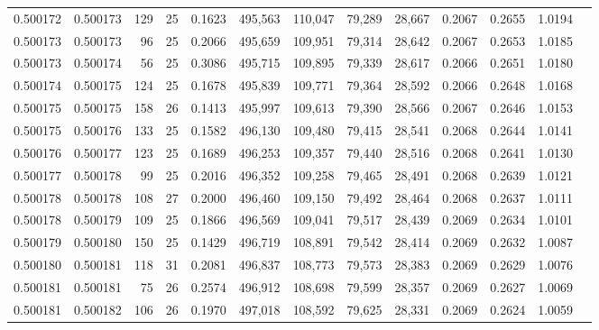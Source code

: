 \begin{tabular}{rrrrrrrrrrrrr}
0.500172 & 0.500173 & 129 &  25 &                                     0.1623 & 495,563 & 110,047 &  79,289 &  28,667 & 0.2067 & 0.2655 & 1.0194 \\
0.500173 & 0.500173 &  96 &  25 &                                     0.2066 & 495,659 & 109,951 &  79,314 &  28,642 & 0.2067 & 0.2653 & 1.0185 \\
0.500173 & 0.500174 &  56 &  25 &                                     0.3086 & 495,715 & 109,895 &  79,339 &  28,617 & 0.2066 & 0.2651 & 1.0180 \\
0.500174 & 0.500175 & 124 &  25 &                                     0.1678 & 495,839 & 109,771 &  79,364 &  28,592 & 0.2066 & 0.2648 & 1.0168 \\
0.500175 & 0.500175 & 158 &  26 &                                     0.1413 & 495,997 & 109,613 &  79,390 &  28,566 & 0.2067 & 0.2646 & 1.0153 \\
0.500175 & 0.500176 & 133 &  25 &                                     0.1582 & 496,130 & 109,480 &  79,415 &  28,541 & 0.2068 & 0.2644 & 1.0141 \\
0.500176 & 0.500177 & 123 &  25 &                                     0.1689 & 496,253 & 109,357 &  79,440 &  28,516 & 0.2068 & 0.2641 & 1.0130 \\
0.500177 & 0.500178 &  99 &  25 &                                     0.2016 & 496,352 & 109,258 &  79,465 &  28,491 & 0.2068 & 0.2639 & 1.0121 \\
0.500178 & 0.500178 & 108 &  27 &                                     0.2000 & 496,460 & 109,150 &  79,492 &  28,464 & 0.2068 & 0.2637 & 1.0111 \\
0.500178 & 0.500179 & 109 &  25 &                                     0.1866 & 496,569 & 109,041 &  79,517 &  28,439 & 0.2069 & 0.2634 & 1.0101 \\
0.500179 & 0.500180 & 150 &  25 &                                     0.1429 & 496,719 & 108,891 &  79,542 &  28,414 & 0.2069 & 0.2632 & 1.0087 \\
0.500180 & 0.500181 & 118 &  31 &                                     0.2081 & 496,837 & 108,773 &  79,573 &  28,383 & 0.2069 & 0.2629 & 1.0076 \\
0.500181 & 0.500181 &  75 &  26 &                                     0.2574 & 496,912 & 108,698 &  79,599 &  28,357 & 0.2069 & 0.2627 & 1.0069 \\
0.500181 & 0.500182 & 106 &  26 &                                     0.1970 & 497,018 & 108,592 &  79,625 &  28,331 & 0.2069 & 0.2624 & 1.0059 \\

\end{tabular}
